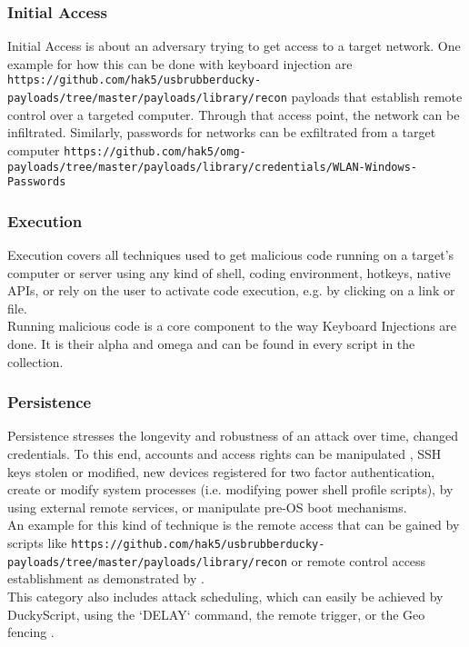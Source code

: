 \subsubsection{Initial Access}

Initial Access is about an adversary trying to get access to a target network. One example for how this can be done with keyboard injection are \verb|https://github.com/hak5/usbrubberducky-payloads/tree/master/payloads/library/recon| payloads that establish remote control over a targeted computer. Through that access point, the network can be infiltrated. Similarly, passwords for networks can be exfiltrated from a target computer \verb|https://github.com/hak5/omg-payloads/tree/master/payloads/library/credentials/WLAN-Windows-Passwords|\\

\subsubsection{Execution}

Execution covers all techniques used to get malicious code running on a target's computer or server using any kind of shell, coding environment, hotkeys, native APIs, or rely on the user to activate code execution, e.g. by clicking on a link or file.\\
Running malicious code is a core component to the way Keyboard Injections are done. It is their alpha and omega and can be found in every script in the collection.

\subsubsection{Persistence} \label{persistence}

Persistence stresses the longevity and robustness of an attack over time, changed credentials. To this end, accounts and access rights can be manipulated , SSH keys stolen or modified, new devices registered for two factor authentication, create or modify system processes (i.e. modifying power shell profile scripts), by using external remote services, or manipulate pre-OS boot mechanisms. \\
An example for this kind of technique is the remote access that can be gained by scripts like \verb|https://github.com/hak5/usbrubberducky-payloads/tree/master/payloads/library/recon| or remote control access establishment as demonstrated by \cite{bojovicRisingThreatHardware2019}. \\
This category also includes attack scheduling, which can easily be achieved by DuckyScript, using the `DELAY` command, the remote trigger, or the Geo fencing \cite{hak5MGCable}.

